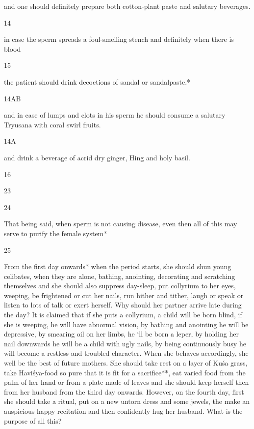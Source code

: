 \begin{translation}
\begin{tt}
and one should definitely prepare both cotton-plant paste and salutary 
  beverages.
  
\item[14]

in case the sperm spreads a foul-smelling stench and definitely when 
  there is blood
  
\item[15]

the patient should drink decoctions of sandal or sandalpaste.*
  
\item[14AB]

and in case of lumps and clots in his sperm he should consume a 
  salutary Tryusana with coral swirl fruits.
  
\item[14A]

and drink a beverage of acrid dry ginger, Hing and holy basil.
  
\item[16]


\item[23]


  
\item[24]

That being said, when sperm is not causing disease, even then all of this 
  may serve to purify the female system*
  
\item[25]

From the first day onwards* when the period starts, she  should shun 
  young celibates, when they are alone, bathing, anointing, decorating and 
  scratching themselves and she should also suppress day-sleep, put collyrium to 
  her eyes, weeping, be frightened or cut her nails, run hither and tither, laugh or 
  speak or listen to lots of talk or exert herself. Why should her partner arrive 
  late during the day? It is claimed that if she puts a collyrium, a child will be born 
  blind, if she is weeping, he will have abnormal vision, by bathing and anointing 
  he will be depressive, by smearing oil on her limbs, he ‘ll be born a leper, by 
  holding her nail downwards he will be a child with ugly nails, by being 
  continuously busy he will become a restless and troubled character. When she 
  behaves accordingly, she well be the best of future mothers. She should take 
  rest on a layer of Kuśa  grass,  take Haviśya-food so pure that it is fit for a 
  sacrifice**, eat varied food from the palm of her hand or from a plate made of 
  leaves and she should keep herself then from her husband from the third day 
  onwards. However, on the fourth day, first she should take a ritual, put on a 
  new untorn dress and some jewels, the make an auspicious happy recitation 
  and then confidently hug her husband. What is the purpose of all this?
  

\end{tt}
\end{translation}
